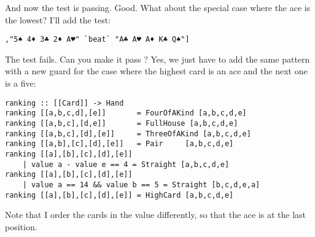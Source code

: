 \success And now the test is passing.
\lhN Good. What about the special case where the ace is the lowest? I'll add the test:
\begin{lstlisting}[frame=single]
       ,"5♠ 4♦ 3♣ 2♦ A♥" `beat` "A♣ A♥ A♦ K♣ Q♠"]
\end{lstlisting}
\failure The test fails. Can you make it pass ?
\lhA \failure Yes, we just have to add the same pattern with a new guard for the case where the highest card is an ace and the next one is a five:
\begin{lstlisting}[frame=single]
ranking :: [[Card]] -> Hand
ranking [[a,b,c,d],[e]]       = FourOfAKind [a,b,c,d,e]
ranking [[a,b,c],[d,e]]       = FullHouse [a,b,c,d,e]
ranking [[a,b,c],[d],[e]]     = ThreeOfAKind [a,b,c,d,e]
ranking [[a,b],[c],[d],[e]]   = Pair     [a,b,c,d,e]
ranking [[a],[b],[c],[d],[e]] 
    | value a - value e == 4 = Straight [a,b,c,d,e] 
ranking [[a],[b],[c],[d],[e]] 
    | value a == 14 && value b == 5 = Straight [b,c,d,e,a] 
ranking [[a],[b],[c],[d],[e]] = HighCard [a,b,c,d,e] 
\end{lstlisting}
\success Note that I order the cards in the value differently, so that the ace is at the last position. 
\lhend

